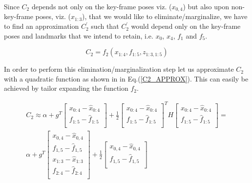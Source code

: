 Since $C_2$ depends not only on the key-frame poses viz. ($x_{0,4}$) but also upon non-key-frame poses, viz. ($x_{1:3}$), that we would like to eliminate/marginalize, we have to find an approximation $C_2^{'}$ such that $C_2^{'}$ would depend only on the key-frame poses and landmarks that we intend to retain, i.e. $x_0$, $x_4$, $f_1$ and $f_5$. 

\begin{equation}
C_2 = f_2(x_{1:4}, f_{1:5}, z_{1:3, 1:5})
\label{FULL_C2_COST}
\end{equation}

In order to perform this elimination/marginalization step let us approximate $C_2$ with a quadratic function as shown in in Eq.(\ref{C2_APPROX}). This can easily be achieved by tailor expanding the function $f_2$.

\begin{equation}
\begin{split}
C_2 \approx \alpha + g^T\begin{bmatrix} x_{0:4} - \hat x_{0:4} \\ 
                                  f_{1:5} - \hat f_{1:5}\\
									\end{bmatrix} 
									+ \frac{1}{2} \begin{bmatrix} x_{0:4} - \hat x_{0:4} \\ 
                                        f_{1:5} - \hat f_{1:5}\\
									              \end{bmatrix}^T H 
												\begin{bmatrix} x_{0:4} - \hat x_{0:4} \\ 
                                        f_{1:5} - \hat f_{1:5}\\
									      \end{bmatrix} = \\
		\alpha + g^T\begin{bmatrix} x_{0,4} - \hat x_{0,4}\\ 
                                f_{1,5} - \hat f_{1,5}\\
																x_{1:3} - \hat x_{1:3}\\ 
                                f_{2:4} - \hat f_{2:4}\\
									\end{bmatrix} 
									+ \frac{1}{2} \begin{bmatrix} x_{0,4} - \hat x_{0,4}\\ 
                                                f_{1,5} - \hat f_{1,5}\\

\end{bmatrix}
\end{split}
\end{equation}
